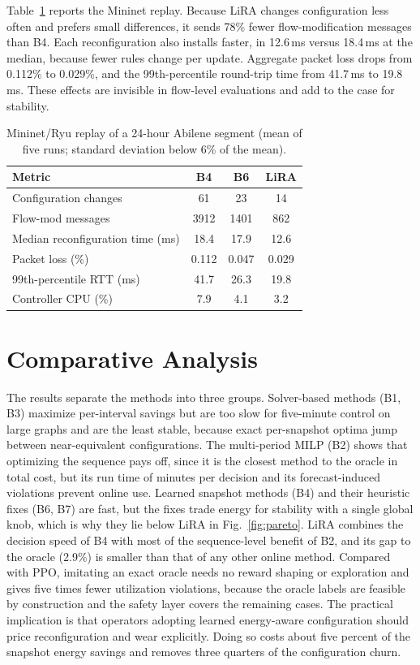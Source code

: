 \documentclass[conference]{IEEEtran}
\begin{document}
Table~\ref{tab:emu} reports the Mininet replay. Because LiRA changes configuration less often and prefers small differences, it sends 78\% fewer flow-modification messages than B4. Each reconfiguration also installs faster, in 12.6\,ms versus 18.4\,ms at the median, because fewer rules change per update. Aggregate packet loss drops from 0.112\% to 0.029\%, and the 99th-percentile round-trip time from 41.7\,ms to 19.8\,ms. These effects are invisible in flow-level evaluations and add to the case for stability.

\begin{table}[t]
\centering
\caption{Mininet/Ryu replay of a 24-hour Abilene segment (mean of five runs; standard deviation below 6\% of the mean).}
\label{tab:emu}
\footnotesize
\setlength{\tabcolsep}{4pt}
\begin{tabular}{@{}lccc@{}}
\toprule
Metric & B4 & B6 & LiRA \\
\midrule
Configuration changes & 61 & 23 & 14 \\
Flow-mod messages & 3912 & 1401 & 862 \\
Median reconfiguration time (ms) & 18.4 & 17.9 & 12.6 \\
Packet loss (\%) & 0.112 & 0.047 & 0.029 \\
99th-percentile RTT (ms) & 41.7 & 26.3 & 19.8 \\
Controller CPU (\%) & 7.9 & 4.1 & 3.2 \\
\bottomrule
\end{tabular}
\end{table}

\section{Comparative Analysis}\label{sec:comparison}

The results separate the methods into three groups. Solver-based methods (B1, B3) maximize per-interval savings but are too slow for five-minute control on large graphs and are the least stable, because exact per-snapshot optima jump between near-equivalent configurations. The multi-period MILP (B2) shows that optimizing the sequence pays off, since it is the closest method to the oracle in total cost, but its run time of minutes per decision and its forecast-induced violations prevent online use. Learned snapshot methods (B4) and their heuristic fixes (B6, B7) are fast, but the fixes trade energy for stability with a single global knob, which is why they lie below LiRA in Fig.~\ref{fig:pareto}. LiRA combines the decision speed of B4 with most of the sequence-level benefit of B2, and its gap to the oracle (2.9\%) is smaller than that of any other online method. Compared with PPO, imitating an exact oracle needs no reward shaping or exploration and gives five times fewer utilization violations, because the oracle labels are feasible by construction and the safety layer covers the remaining cases. The practical implication is that operators adopting learned energy-aware configuration should price reconfiguration and wear explicitly. Doing so costs about five percent of the snapshot energy savings and removes three quarters of the configuration churn.
\end{document}
